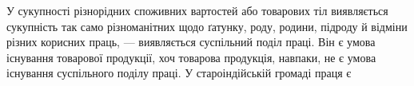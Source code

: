 У сукупності різнорідних споживних вартостей або товарових
тіл виявляється сукупність так само різноманітних щодо ґатунку,
роду, родини, підроду й відміни різних корисних праць, — виявляється
суспільний поділ праці. Він є умова існування товарової
продукції, хоч товарова продукція, навпаки, не є умова існування
суспільного поділу праці. У староіндійській громаді праця є
\parbreak{}  %
